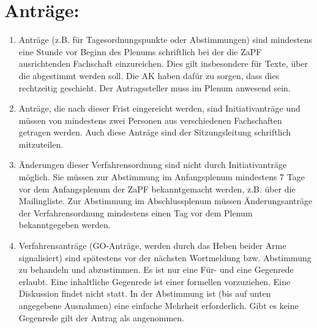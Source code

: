 \noindent
\section{Anträge:}
\begin{enumerate}
\item{Anträge (z.B. für Tagesordnungspunkte oder Abstimmungen) sind mindestens eine Stunde vor
Beginn des Plenums schriftlich bei der die ZaPF ausrichtenden Fachschaft einzureichen. Dies gilt
insbesondere für Texte, über die abgestimmt werden soll. Die AK haben dafür zu sorgen, dass dies
rechtzeitig geschieht. Der Antragssteller muss im Plenum anwesend sein.}

\item{Anträge, die nach dieser Frist eingereicht werden, sind Initiativanträge und müssen von mindestens
zwei Personen aus verschiedenen Fachschaften getragen werden. Auch diese Anträge sind der
Sitzungsleitung schriftlich mitzuteilen.}

\item{Änderungen dieser Verfahrensordnung sind nicht durch Initiativanträge möglich. Sie müssen zur
Abstimmung im Anfangsplenum mindestens 7 Tage vor dem Anfangsplenum der ZaPF
bekanntgemacht werden, z.B. über die Mailingliste. Zur Abstimmung im Abschlussplenum müssen
Änderungsanträge der Verfahrensordnung mindestens einen Tag vor dem Plenum bekanntgegeben
werden.}

\item{Verfahrensanträge (GO-Anträge, werden durch das Heben beider Arme signalisiert) sind spätestens
vor der nächsten Wortmeldung bzw. Abstimmung zu behandeln und
abzustimmen. Es ist nur eine Für- und eine Gegenrede erlaubt. Eine
inhaltliche Gegenrede ist einer formellen vorzuziehen. Eine
Diskussion findet nicht statt. In der Abstimmung ist (bis auf unten
angegebene Ausnahmen) eine einfache Mehrheit erforderlich. Gibt es
keine Gegenrede gilt der Antrag als angenommen.}



\end{enumerate}
